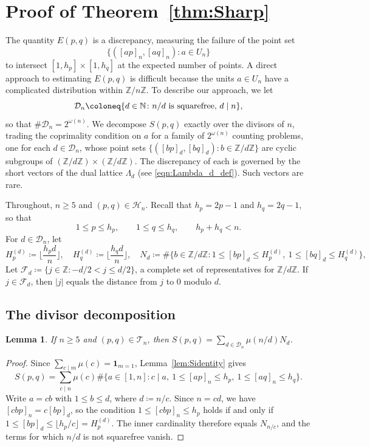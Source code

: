 \documentclass[12pt]{amsart}
\newtheorem{lemma}[theorem]{Lemma}
\theoremstyle{definition}
\newcommand{\Z}{\mathbb{Z}}
\newcommand{\N}{\mathbb{N}}
\begin{document}
\section{Proof of Theorem~\texorpdfstring{\ref{thm:Sharp}}{1.1}}
\label{sec:Sharper}

The quantity $E(p,q)$ is a discrepancy, measuring the failure of the point set
\[
\{([ap]_n,[aq]_n)\colon a\in U_n\}
\]
to intersect $[1,h_p]\times[1,h_q]$ at the expected number of points.  A direct approach to estimating $E(p,q)$ is difficult because the units $a\in U_n$ have a complicated distribution within $\Z/n\Z$.  To describe our approach, we let
\[
\mathcal{D}_n\coloneq \{d\in\N\colon n/d\ \textup{is squarefree, $d\mid n$}\},
\]
so that $\#\mathcal{D}_n=2^{\omega(n)}$.  We decompose $S(p,q)$ exactly over the divisors of $n$, trading the coprimality condition on $a$ for a family of $2^{\omega(n)}$ counting problems, one for each $d\in\mathcal{D}_n$, whose point sets $\{([bp]_d,[bq]_d)\colon b\in\Z/d\Z\}$ are cyclic subgroups of $(\Z/d\Z)\times(\Z/d\Z)$.  The discrepancy of each is governed by the short vectors of the dual lattice $\Lambda_d$ (see \eqref{eqn:Lambda_d_def}).  Such vectors are rare.

Throughout, $n\ge 5$ and $(p,q)\in\mathcal{H}_n$.  Recall that $h_p=2p-1$ and
$h_q=2q-1$, so that
\begin{equation}
\label{eqn:hsum}
1\le p\le h_p,\qquad 1\le q\le h_q,\qquad h_p+h_q<n.
\end{equation}
  For $d\in\mathcal{D}_n$, let
\[
H_p^{(d)}\coloneq \Big\lfloor\frac{h_p d}{n}\Big\rfloor,\quad H_q^{(d)}\coloneq \Big\lfloor\frac{h_q d}{n}\Big\rfloor,\quad
N_d\coloneq \#\big\{b\in\Z/d\Z\colon 1\le[bp]_d\le H_p^{(d)},\ 1\le[bq]_d\le H_q^{(d)}\big\},
\]
Let $\mathcal{F}_d\coloneq \{j\in\Z\colon -d/2<j\le d/2\}$, a
complete set of representatives for $\Z/d\Z$.  If $j\in\mathcal{F}_d$, then $|j|$ equals the
distance from $j$ to $0$ modulo $d$.

\subsection{The divisor decomposition}

\begin{lemma}
\label{lem:divdecomp}
If $n\ge5$ and $(p,q)\in\mathcal{T}_n$, then $S(p,q)=\sum_{d\in\mathcal{D}_n}\mu(n/d)N_d$.
\end{lemma}

\begin{proof}
Since $\sum_{c\mid m}\mu(c)=\mathbf{1}_{m=1}$, Lemma~\ref{lem:Sidentity} gives
\[
S(p,q)=\sum_{c\mid n}\mu(c) \#\{a\in[1,n]\colon c\mid a,\ 1\le[ap]_n\le h_p,\ 1\le[aq]_n\le h_q\}.
\]
Write $a=cb$ with $1\le b\le d$, where $d\coloneq n/c$.  Since $n=cd$, we have $[cbp]_n=c [bp]_d$, so
the condition $1\le[cbp]_n\le h_p$ holds if and only if $1\le[bp]_d\le\lfloor h_p/c\rfloor=H_p^{(d)}$.
The inner cardinality therefore equals $N_{n/c}$, and the terms for which $n/d$ is not squarefree
vanish.
\end{proof}
\end{document}
